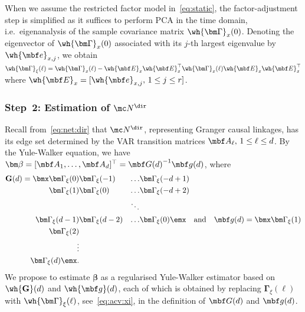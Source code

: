 When we assume the restricted factor model in~\eqref{eq:static}, the factor-adjustment step is simplified as it suffices to perform PCA in the time domain, i.e.\ eigenanalysis of the sample covariance matrix $\wh{\bm\Gamma}_x(0)$. Denoting the eigenvector of $\wh{\bm\Gamma}_x(0)$ associated with its $j$-th largest eigenvalue by $\wh{\mbf e}_{x, j}$, we obtain $\wh{\bm\Gamma}_\xi(\ell) = \wh{\bm\Gamma}_x(\ell) - \wh{\mbf E}_x \wh{\mbf E}_x^\top \wh{\bm\Gamma}_x(\ell) \wh{\mbf E}_x \wh{\mbf E}_x^\top$ where $\wh{\mbf E}_x = [\wh{\mbf e}_{x, j}, \, 1 \le j \le r]$.

\subsubsection{Step~2: Estimation of $\mc N^{\dir}$}
\label{sec:step:two}

Recall from~\eqref{eq:net:dir} that $\mc N^{\dir}$, representing Granger causal linkages, has its edge set determined by the VAR transition matrices $\mbf A_\ell, \, 1 \le \ell \le d$. 
By the Yule-Walker equation, we have $\bm\beta = [ \mbf A_1, \dots, \mbf A_{d} ]^\top = {\mbf G(d)}^{-1} \mbf g(d)$, where
\begin{align}
\label{eq:gg}
\mathbf G(d) = \bmx 
\bm\Gamma_\xi(0) & \bm\Gamma_\xi(-1) & \ldots & \bm\Gamma_\xi(-d + 1) 
\\
\bm\Gamma_\xi(1) & \bm\Gamma_\xi(0) & \ldots & \bm\Gamma_\xi(-d + 2)
\\
& & \ddots & 
\\
\bm\Gamma_\xi(d - 1) & \bm\Gamma_\xi(d - 2) & \ldots & \bm\Gamma_\xi(0)
\emx 
\quad \text{and} \quad
\mbf g(d) = \bmx
\bm\Gamma_\xi(1)
\\
\bm\Gamma_\xi(2)
\\
\vdots
\\
\bm\Gamma_\xi(d)
\emx.
\end{align}
We propose to estimate $\bm\beta$ as a regularised Yule-Walker estimator based on $\wh{\mathbf G}(d)$ and $\wh{\mbf g}(d)$, each of which is obtained by replacing $\bm\Gamma_\xi(\ell)$ with $\wh{\bm\Gamma}_\xi(\ell)$, see~\eqref{eq:acv:xi}, in the definition of $\mbf G(d)$ and $\mbf g(d)$.


